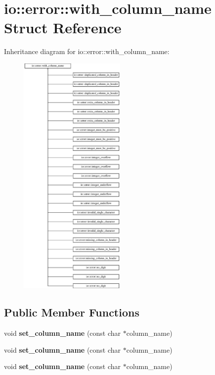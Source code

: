 \hypertarget{structio_1_1error_1_1with__column__name}{}\section{io\+:\+:error\+:\+:with\+\_\+column\+\_\+name Struct Reference}
\label{structio_1_1error_1_1with__column__name}
Inheritance diagram for io\+:\+:error\+:\+:with\+\_\+column\+\_\+name\+:\begin{figure}[H]
\begin{center}
\leavevmode
\includegraphics[height=12.000000cm]{d6/dbd/structio_1_1error_1_1with__column__name}
\end{center}
\end{figure}
\subsection*{Public Member Functions}
\begin{DoxyCompactItemize}
\item 
\mbox{\label{structio_1_1error_1_1with__column__name_a2a8144d3591a4bb618368ca7261befef}} 
void {\bfseries set\+\_\+column\+\_\+name} (const char $\ast$column\+\_\+name)
\item 
\mbox{\label{structio_1_1error_1_1with__column__name_a2a8144d3591a4bb618368ca7261befef}} 
void {\bfseries set\+\_\+column\+\_\+name} (const char $\ast$column\+\_\+name)
\item 
\mbox{\label{structio_1_1error_1_1with__column__name_a2a8144d3591a4bb618368ca7261befef}} 
void {\bfseries set\+\_\+column\+\_\+name} (const char $\ast$column\+\_\+name)
\end{DoxyCompactItemize}

